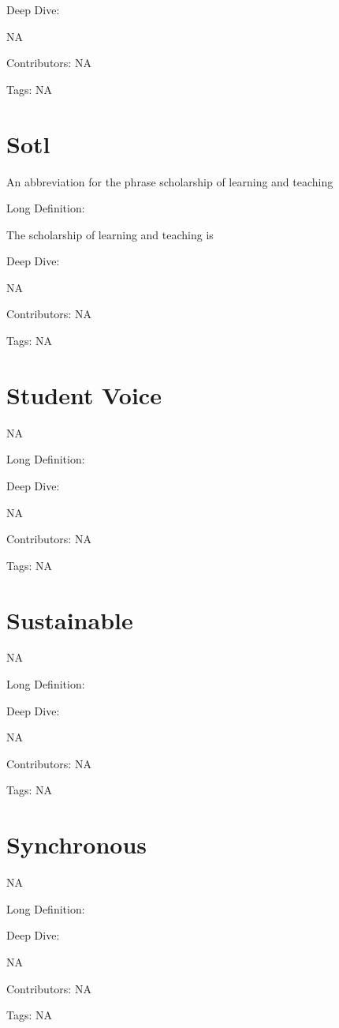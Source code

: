 \documentclass[
  letterpaper,
  DIV=11,
  numbers=noendperiod]{scrreprt}
\begin{document}
Deep Dive:

NA

Contributors: NA

Tags: NA

\section{Sotl}\label{sotl}

An abbreviation for the phrase scholarship of learning and teaching

Long Definition:

The scholarship of learning and teaching is

Deep Dive:

NA

Contributors: NA

Tags: NA

\section{Student Voice}\label{student-voice}

NA

Long Definition:

Deep Dive:

NA

Contributors: NA

Tags: NA

\section{Sustainable}\label{sustainable}

NA

Long Definition:

Deep Dive:

NA

Contributors: NA

Tags: NA

\section{Synchronous}\label{synchronous}

NA

Long Definition:

Deep Dive:

NA

Contributors: NA

Tags: NA

\end{document}
